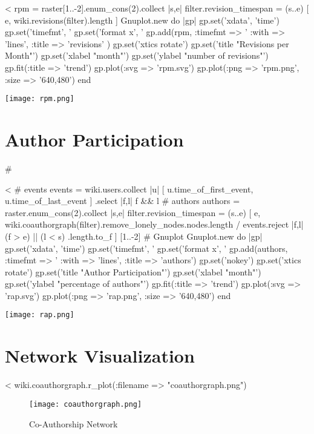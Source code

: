 \documentclass{scrartcl}
\begin{document}
<%
rpm = raster[1..-2].enum_cons(2).collect { |s,e| 
	filter.revision_timespan = (s..e)
	[ e, wiki.revisions(filter).length ]
	}
Gnuplot.new do |gp|
	gp.set('xdata', 'time')
	gp.set('timefmt', '%
	gp.set('format x', '%
	gp.add(rpm, :timefmt => '%
		:with => 'lines', 
		:title => 'revisions' )
	gp.set('xtics rotate')
	gp.set('title "Revisions per Month"')
	gp.set('xlabel "month"')
	gp.set('ylabel "number of revisions"')
	gp.fit(:title => 'trend')
	gp.plot(:svg => 'rpm.svg')
	gp.plot(:png => 'rpm.png', :size => '640,480')
end
\begin{center}
  \texttt{[image: rpm.png]}
\end{center}


\section{Author Participation} %
\label{sec:author_participation}#

<%
# events
events = wiki.users.collect{ |u| 
	[ u.time_of_first_event, u.time_of_last_event ] 
    }.select { |f,l| f && l }
# authors
authors = raster.enum_cons(2).collect { |s,e|
	filter.revision_timespan = (s..e)
	[ e,
    	wiki.coauthorgraph(filter).remove_lonely_nodes.nodes.length /
        events.reject { |f,l| (f > e) || (l < s) }.length.to_f ]
	}[1..-2]
# Gnuplot
Gnuplot.new do |gp|
	gp.set('xdata', 'time')
	gp.set('timefmt', '%
	gp.set('format x', '%
	gp.add(authors, :timefmt => '%
		:with => 'lines',
		:title => 'authors')
	gp.set('nokey')
	gp.set('xtics rotate')
	gp.set('title "Author Participation"')
	gp.set('xlabel "month"')
	gp.set('ylabel "percentage of authors"')
	gp.fit(:title => 'trend')
	gp.plot(:svg => 'rap.svg')
	gp.plot(:png => 'rap.png', :size => '640,480')
end
\begin{center}
  \texttt{[image: rap.png]}
\end{center}


\section{Network Visualization} %
\label{sec:network_visualization}

<%
wiki.coauthorgraph.r_plot(:filename => "coauthorgraph.png")
\begin{figure}
	\centering
	\texttt{[image: coauthorgraph.png]}
	\caption{Co-Authorship Network}
	\label{fig:co-authorship_network}
\end{figure}
\end{document}
